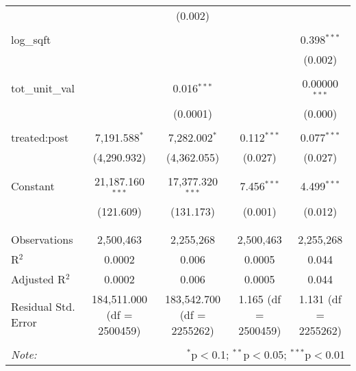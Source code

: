\begin{table}[H]
{\begin{tabular}{@{\extracolsep{5pt}}lcccc}
   &  & (0.002) &  &  \\  

   & & & & \\  

  log\_sqft &  &  &  & 0.398$^{***}$ \\  

   &  &  &  & (0.002) \\  

   & & & & \\  

  tot\_unit\_val &  & 0.016$^{***}$ &  & 0.00000$^{***}$ \\  

   &  & (0.0001) &  & (0.000) \\  

   & & & & \\  

  treated:post & 7,191.588$^{*}$ & 7,282.002$^{*}$ & 0.112$^{***}$ & 0.077$^{***}$ \\  

   & (4,290.932) & (4,362.055) & (0.027) & (0.027) \\  

   & & & & \\  

  Constant & 21,187.160$^{***}$ & 17,377.320$^{***}$ & 7.456$^{***}$ & 4.499$^{***}$ \\  

   & (121.609) & (131.173) & (0.001) & (0.012) \\  

   & & & & \\  

 \hline \\[-1.8ex]  

 Observations & 2,500,463 & 2,255,268 & 2,500,463 & 2,255,268 \\  

 R$^{2}$ & 0.0002 & 0.006 & 0.0005 & 0.044 \\  

 Adjusted R$^{2}$ & 0.0002 & 0.006 & 0.0005 & 0.044 \\  

 Residual Std. Error & 184,511.000 (df = 2500459) & 183,542.700 (df = 2255262) & 1.165 (df = 2500459) & 1.131 (df = 2255262) \\  

 \hline  

 \hline \\[-1.8ex]  

 \textit{Note:}  & \multicolumn{4}{r}{$^{*}$p$<$0.1; $^{**}$p$<$0.05; $^{***}$p$<$0.01} \\  

 \end{tabular}}  

 \end{table}  

